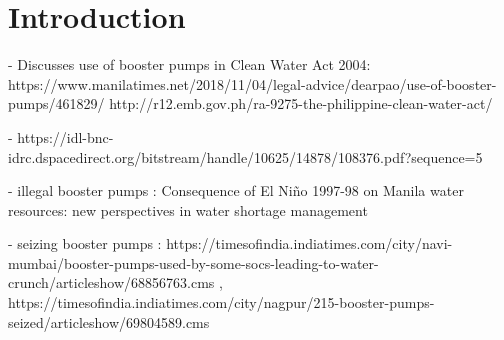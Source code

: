 \documentclass[12pt]{article}
\begin{document}
\section{Introduction}

- Discusses use of booster pumps in Clean Water Act 2004:  https://www.manilatimes.net/2018/11/04/legal-advice/dearpao/use-of-booster-pumps/461829/  http://r12.emb.gov.ph/ra-9275-the-philippine-clean-water-act/

- https://idl-bnc-idrc.dspacedirect.org/bitstream/handle/10625/14878/108376.pdf?sequence=5

- illegal booster pumps :  Consequence of El Niño 1997-98 on Manila water resources: new perspectives in water shortage management

- seizing booster pumps : https://timesofindia.indiatimes.com/city/navi-mumbai/booster-pumps-used-by-some-socs-leading-to-water-crunch/articleshow/68856763.cms , https://timesofindia.indiatimes.com/city/nagpur/215-booster-pumps-seized/articleshow/69804589.cms



{
\small
\nocite{*}


}



%  

%    



%
\end{document}
